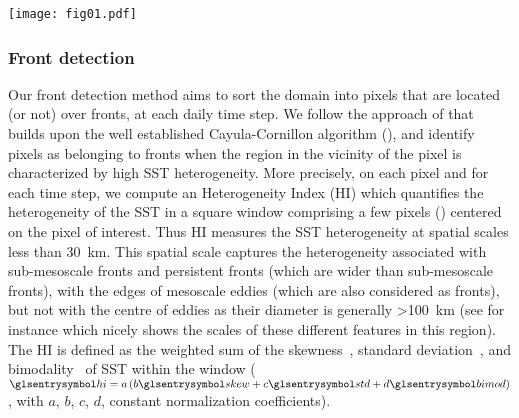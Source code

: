 \begin{figure*}
  \centering
  \texttt{[image: fig01.pdf]}
  \caption[Delimitation of biomes]{
    Delimitation of the three biomes in the open ocean Gulf Stream extension region: the Permanent Subtropical Biome (PSB, south of the dashed line at ), the Seasonal Subtropical Biome (SSB, between  and the meandering Gulf Stream northern wall on that day marked with the black contour), and the sub-Polar Biome (PB, north of the Gulf Stream northern wall).
    (a)~SST and (b)~ snapshots on the 22 April 2007 (with data masked by clouds in white). The red line follows the \qty{1500}{\m} isobath.
    Data on the continental shelf (\qty{<1500}{\m}) is not considered here and have been masked.
    (c)~SST and (d)~ distribution within each biome for the same day (PB:~blue, SSB:~yellow, PSB:~red).
    The black line in (c) shows the SST threshold value detected to delimit the Gulf Stream northern wall (see methods section).
  }%
  \label{fig:zone-separation}
\end{figure*}

\subsubsection{Front detection}

Our front detection method aims to sort the domain into pixels that are located (or not) over fronts, at each daily time step.
We follow the approach of \textcite{liu_2016} that builds upon the well established Cayula-Cornillon algorithm (\cite{cayula_1992, belkin_2009}), and identify pixels as belonging to fronts when the region in the vicinity of the pixel is characterized by high SST heterogeneity.
More precisely, on each pixel and for each time step, we compute an Heterogeneity Index (HI) which quantifies the heterogeneity of the SST in a square window comprising a few pixels () centered on the pixel of interest.
Thus HI measures the SST heterogeneity at spatial scales less than \qty{30}{\km}.
This spatial scale captures the heterogeneity associated with sub-mesoscale fronts and persistent fronts (which are wider than sub-mesoscale fronts), with the edges of mesoscale eddies (which are also considered as fronts), but not with the centre of eddies as their diameter is generally \qty{>100}{\km} (see for instance \textcite{contreras_2023} which nicely shows the scales of these different features in this region).
The HI is defined as the weighted sum of the skewness~, standard deviation~, and bimodality~ of SST within the window (\(\am{hi} = a \paren{ b \am{skew} + c \am{std} + d \am{bimod} }\), with \(a\), \(b\), \(c\), \(d\), constant normalization coefficients).


